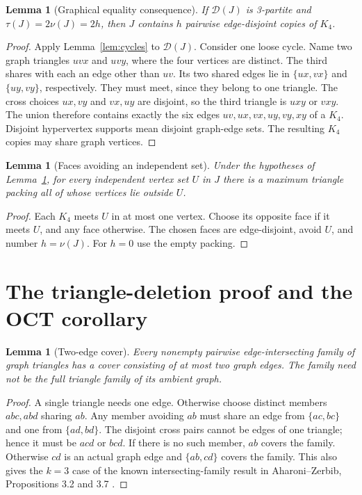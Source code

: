 \documentclass[11pt]{article}
\newtheorem{lemma}[theorem]{Lemma}
\newcommand{\D}{\mathcal D}
\begin{document}
\begin{lemma}[Graphical equality consequence]\label{lem:k4}
If $\D(J)$ is 3-partite and $\tau(J)=2\nu(J)=2h$, then $J$ contains
$h$ pairwise edge-disjoint copies of $K_4$.
\end{lemma}
\begin{proof}
Apply Lemma~\ref{lem:cycles} to $\D(J)$. Consider one loose cycle.
Name two graph triangles $uvx$ and $uvy$, where the four vertices are
distinct. The third shares with each an edge other than $uv$.
Its two shared edges lie in $\{ux,vx\}$ and $\{uy,vy\}$, respectively.
They must meet, since they belong to one triangle. The cross choices
$ux,vy$ and $vx,uy$ are disjoint, so the third triangle is $uxy$ or $vxy$.
The union therefore contains exactly the six edges
$uv,ux,vx,uy,vy,xy$ of a $K_4$. Disjoint hypervertex supports mean disjoint
graph-edge sets. The resulting $K_4$ copies may share graph vertices.
\end{proof}

\begin{lemma}[Faces avoiding an independent set]\label{lem:faces}
Under the hypotheses of Lemma~\ref{lem:k4}, for every independent vertex
set $U$ in $J$ there is a maximum triangle packing all of whose vertices
lie outside $U$.
\end{lemma}
\begin{proof}
Each $K_4$ meets $U$ in at most one vertex. Choose its opposite face if
it meets $U$, and any face otherwise. The chosen faces are edge-disjoint,
avoid $U$, and number $h=\nu(J)$. For $h=0$ use the empty packing.
\end{proof}

\section{The triangle-deletion proof and the OCT corollary}
\begin{lemma}[Two-edge cover]\label{lem:intersecting}
Every nonempty pairwise edge-intersecting family of graph triangles has
a cover consisting of at most two graph edges. The family need not be
the full triangle family of its ambient graph.
\end{lemma}
\begin{proof}
A single triangle needs one edge. Otherwise choose distinct members
$abc,abd$ sharing $ab$. Any member avoiding $ab$ must share an edge from
$\{ac,bc\}$ and one from $\{ad,bd\}$. The disjoint cross pairs cannot
be edges of one triangle; hence it must be $acd$ or $bcd$.
If there is no such member, $ab$ covers the family. Otherwise $cd$ is
an actual graph edge and $\{ab,cd\}$ covers the family.
This also gives the $k=3$ case of the known intersecting-family result
in Aharoni--Zerbib, Propositions 3.2 and 3.7 \cite{AZ}.
\end{proof}
\end{document}
